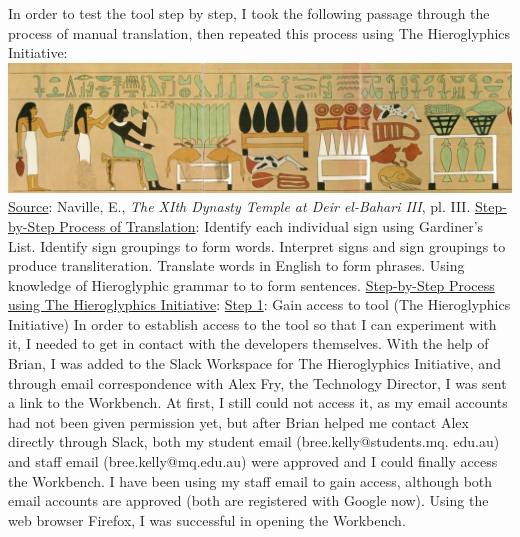 \documentclass{article}
\begin{document}
\newpage {}
\newline \break \noindent
In order to test the tool step by step, I took the following passage through the process of manual translation, then repeated this process using The Hieroglyphics Initiative:
\newline \break
\includegraphics[width=1.0\textwidth]{hiero_2.PNG}
\break \noindent \underline{Source}: Naville, E.,\textit{ The XIth Dynasty Temple at Deir el-Bahari III}, pl. III.
\newline \break \noindent
\underline{Step-by-Step Process of Translation}:
\newline \break
Identify each individual sign using Gardiner's List.
\newline \break
Identify sign groupings to form words.
\newline \break
Interpret signs and sign groupings to produce transliteration.
\newline \break
Translate words in English to form phrases.
\newline \break
Using knowledge of Hieroglyphic grammar to to form sentences.
\newline \break \noindent
\underline{Step-by-Step Process using The Hieroglyphics Initiative}:
\newline \break \noindent
\underline{Step 1}: Gain access to tool (The Hieroglyphics Initiative)
\newline \break \noindent
In order to establish access to the tool so that I can experiment with it, I needed to get in contact with the developers themselves. With the help of Brian, I was added to the Slack Workspace for The Hieroglyphics Initiative, and through email correspondence with Alex Fry, the Technology Director, I was sent a link to the Workbench. At first, I still could not access it, as my email accounts had not been given permission yet, but after Brian helped me contact Alex directly through Slack, both my student email (bree.kelly@students.mq.
\newline edu.au) and staff email (bree.kelly@mq.edu.au) were approved and I could finally access the Workbench. I have been using my staff email to gain access, although both email accounts are approved (both are registered with Google now). Using the web browser Firefox, I was successful in opening the Workbench.
\end{document}
